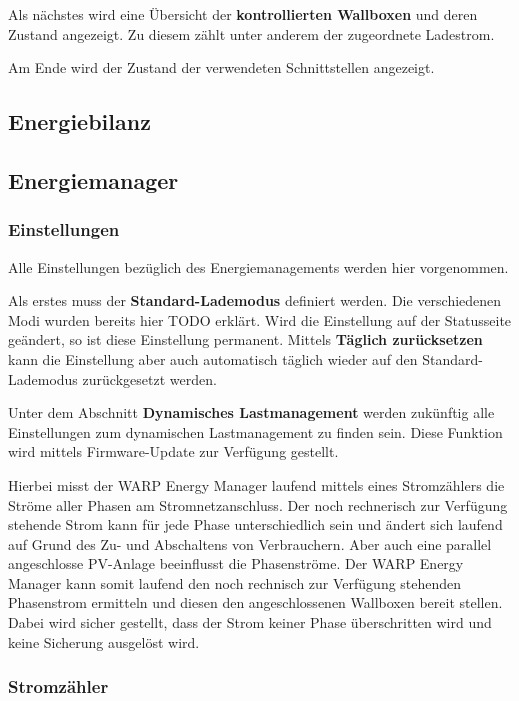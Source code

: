\documentclass[a4paper,10pt]{article}
\newcommand{\gfx}[1]{\texttt{[image: \#1]}}
\begin{document}
\begin{multicols*}{2}
	Als nächstes wird eine Übersicht der \textbf{kontrollierten Wallboxen} und deren
	Zustand angezeigt. Zu diesem zählt unter anderem der zugeordnete Ladestrom.

	Am Ende wird der Zustand der verwendeten Schnittstellen angezeigt.



	\subsection{Energiebilanz}
	\subsection{Energiemanager}
	\subsubsection{Einstellungen}
	Alle Einstellungen bezüglich des Energiemanagements werden hier vorgenommen.

	Als erstes muss der \textbf{Standard-Lademodus} definiert werden. Die
	verschiedenen Modi wurden bereits hier TODO erklärt. Wird die Einstellung
	auf der Statusseite geändert, so ist diese Einstellung permanent.
	Mittels \textbf{Täglich zurücksetzen} kann die Einstellung aber auch 
	automatisch täglich wieder auf den Standard-Lademodus zurückgesetzt werden.

	Unter dem Abschnitt \textbf{Dynamisches Lastmanagement} werden zukünftig
	alle Einstellungen zum dynamischen Lastmanagement zu finden sein. Diese
	Funktion wird mittels Firmware-Update zur Verfügung gestellt.

	Hierbei misst der WARP Energy Manager laufend mittels eines Stromzählers die
	Ströme aller Phasen am Stromnetzanschluss. Der noch rechnerisch zur
	Verfügung stehende Strom kann für jede Phase unterschiedlich sein und ändert
	sich laufend auf Grund des Zu- und Abschaltens von Verbrauchern. Aber auch eine
	parallel angeschlosse PV-Anlage beeinflusst die Phasenströme. Der WARP
	Energy Manager kann somit laufend den noch rechnisch zur Verfügung stehenden
	Phasenstrom ermitteln und diesen den angeschlossenen Wallboxen bereit
	stellen. Dabei wird sicher gestellt, dass der Strom keiner Phase
	überschritten wird und keine Sicherung ausgelöst wird.


	\subsubsection{Stromzähler}

\end{multicols*}
\end{document}
